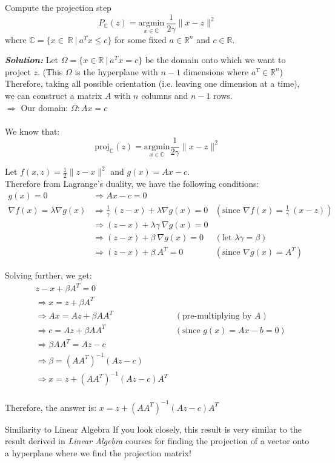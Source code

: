 \documentclass[a4paper, 11pt]{article}
\newcommand{\prob}[2]{\begin{problem}{#1}{}#2\end{problem}}
\newcommand{\nt}[2]{\begin{note}{#1}{}#2\end{note}}
\begin{document}
\prob{}{
  Compute the projection step
  \[
    P_{\mathbb{C}}(z) = \underset{x \in \mathbb{C}}{\mathrm{argmin}} \ \frac{1}{2\gamma} \lVert x - z \rVert ^2
  \]
  where $\mathbb{C} = \{x \in \ \mathbb{R} \ | \ a^Tx \le c \}$ for some fixed $a \in \mathbb{R}^n$ and $c \in \mathbb{R}$.
}

\setlength{\parindent}{0cm}\textbf{\textit{Solution: }}\setlength{\parindent}{1cm}
Let $\Omega = \{ x \in \mathbb{R} \ | \ a^Tx = c \}$ be the domain onto which we want to project $z$. (This $\Omega$ is the hyperplane with $n-1$ dimensions where $a^T \in \mathbb{R}^n$) \\
Therefore, taking all possible orientation (i.e. leaving one dimension at a time), we can construct a matrix $A$ with $n$ columns and $n-1$ rows. \\
$\Longrightarrow$ Our domain: $\Omega: Ax = c$ \\
\\
We know that:
\[
  \textrm{proj}_{\mathbb{C}}(z) = \underset{x \in \mathbb{C}}{\textrm{argmin}} \frac{1}{2 \gamma} \lVert x - z \rVert ^2
\]

\noindent Let $f(x, z) = \frac{1}{2} \lVert z - x \rVert ^2$ and $g(x) = Ax - c$. \\
Therefore from Lagrange's duality, we have the following conditions:
\begin{align}
  g(x) = 0 & \Rightarrow Ax - c = 0 \\
  \nonumber \nabla f(x) = \lambda \nabla g(x) & \Rightarrow \frac{1}{\gamma} \ (z - x) + \lambda \nabla g(x) = 0 & (\textrm{since } \nabla f(x) = \frac{1}{\gamma} \ (x - z)) \\
  \nonumber & \Rightarrow (z - x) + \lambda \gamma \ \nabla g(x) = 0 \\
  \nonumber & \Rightarrow (z - x) + \beta \ \nabla g(x) = 0  & (\textrm{let } \lambda \gamma = \beta) \\
            & \Rightarrow (z - x) + \beta \ A^T = 0 & (\textrm{since } \nabla g(x) = A^T)
\end{align}

Solving further, we get:
\begin{align*}
  & z - x + \beta A^T = 0 \\
  & \Rightarrow x = z + \beta A^T \\
  & \Rightarrow Ax = Az + \beta AA^T & (\textrm{pre-multiplying by } A) \\
  & \Rightarrow c = Az + \beta AA^T & (\textrm{since } g(x) = Ax - b = 0) \\
  & \Rightarrow \beta AA^T = Az - c \\
  & \Rightarrow \beta = (AA^T)^{-1} (Az - c) \\
  & \Rightarrow x = z + (AA^T)^{-1} (Az - c) A^T \\
\end{align*}

Therefore, the answer is:
$\boxed{x = z + (AA^T)^{-1} (Az - c) A^T}$

\nt{Similarity to Linear Algebra}{
  If you look closely, this result is very similar to the result derived in \emph{Linear Algebra} courses for finding the projection of a vector onto a hyperplane where we find the projection matrix!
}
\end{document}
